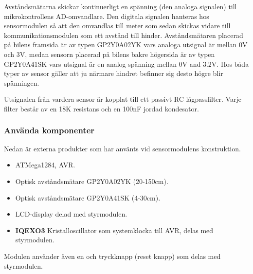 \documentclass[tekniskrapport/tech.tex]{subfiles}
\begin{document}
Avståndsmätarna skickar kontinuerligt en spänning (den analoga signalen) till
mikrokontrollens AD-omvandlare. Den digitala signalen hanteras hos
sensormodulen så att den omvandlas till meter som sedan skickas vidare till
kommunikationsmodulen som ett avstånd till hinder. Avståndsmätaren placerad på
bilens framsida är av typen GP2Y0A02YK vars analoga utsignal är mellan 0V och
3V, medan sensorn placerad på bilens bakre högersida är av typen GP2Y0A41SK
vars utsignal är en analog spänning mellan 0V and 3.2V. Hos båda typer av
sensor gäller att ju närmare hindret befinner sig desto högre blir spänningen. 

Utsignalen från vardera sensor är kopplat till ett passivt RC-lågpassfilter. Varje filter består av en 18K resistans och en
100nF jordad kondesator.

\subsubsection{Använda komponenter}
Nedan är externa produkter som har använts vid sensormodulens konstruktion.
\begin{itemize}
	\item \textbf{\modMicrocontroller} ATMega1284, AVR. 
    \item \textbf{\modDistf} Optisk avståndsmätare GP2Y0A02YK (20-150cm).
    \item \textbf{\modDists} Optisk avståndsmätare GP2Y0A41SK (4-30cm).
    \item \textbf{\modLcd} LCD-display delad med styrmodulen.
    \item \textbf{IQEXO3} Kristalloscillator som systemklocka till AVR, delas
    med styrmodulen.
\end{itemize}
Modulen använder även en {\modJtag} och tryckknapp (reset knapp) som delas med
styrmodulen.
\end{document}
